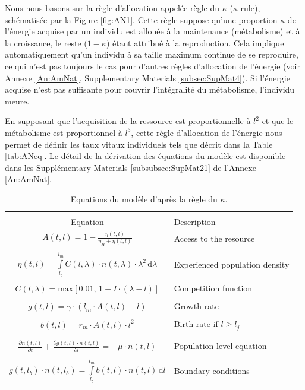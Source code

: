 Nous nous basons sur la règle d'allocation appelée règle du
$\kappa$ ($\kappa$-rule), schématisée par la Figure \ref{fig:AN1}. Cette règle
suppose qu'une proportion $\kappa$ de l'énergie acquise par un individu est
allouée à la maintenance (métabolisme) et à la croissance, le reste ($1-\kappa$)
étant attribué à la reproduction. Cela implique automatiquement qu'un individu à sa
taille maximum continue de se reproduire, ce qui n'est pas toujours le cas pour
d'autres règles d'allocation de l'énergie (voir Annexe \ref{An:AmNat},
Supplementary Materials \ref{subsec:SupMat4}). Si l'énergie acquise n'est pas
suffisante pour couvrir l'intégralité du métabolisme, l'individu meure. 

En supposant que l'acquisition de la ressource est proportionnelle à $l^2$
et que le métabolisme est proportionnel à $l^3$, cette règle d'allocation de
l'énergie nous permet de définir les taux vitaux individuels tels que décrit
dans la Table \ref{tab:ANeq}. Le détail de la dérivation des équations du modèle
est disponible dans les Supplémentary Materials \ref{subsubsec:SupMat21} de
l'Annexe \ref{An:AmNat}. 

\begin{table}
\centering
\caption{\label{tab:ANEq} Equations du modèle d'après la règle du $\kappa$.}
\begin{tabular}{cl}
\hline 
\hline
&\\
Equation & Description \\
\hline
	$\displaystyle{A(t,l)=1-\frac{\eta(t,l)}{\eta_{H}+\eta(t,l)}}$ & Access to the
	resource\\
	&\\
	$\displaystyle{\eta (t,l) = \int\limits_{l_b}^{l_m} C(l,\lambda)\cdot
	n(t,\lambda)\cdot \lambda^2\,\text{d}\lambda}$ & Experienced population
	density\\
	&\\
	$\displaystyle{C(l,\lambda) = \text{max}[0.01,\, 1+I\cdot(\lambda-l)]}$ &
	Competition function \\
	&\\
	$\displaystyle{g(t,l) = \gamma\cdot(l_m \cdot A(t,l)-l)}$ & Growth rate\\
	&\\
	$\displaystyle{b(t,l) = r_m \cdot A(t,l)\cdot l^2}$ & Birth rate if $l\geq
	l_j$\\
	&\\
	&\\
	$\displaystyle{\frac{\partial n(t,l)}{\partial t}+ \frac{\partial
	g(t,l)\cdot n(t,l)}{\partial l} = -\mu \cdot n(t,l) }$ & Population level
	equation\\
	&\\
	$\displaystyle{g(t,l_b)\cdot n(t,l_b) = \int\limits_{l_b}^{l_m} b(t,l)\cdot
	n(t,l) \, \text{d}l}$ & Boundary conditions \\
\hline 
\end{tabular} 
\end{table}

